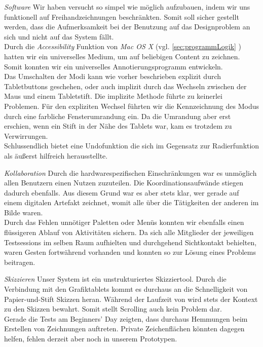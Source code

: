 \medskip \emph{Software} Wir haben versucht \scribbler so simpel wie möglich aufzubauen, indem wir uns funktionell auf Freihandzeichnungen beschränkten. Somit soll sicher gestellt werden, dass die Aufmerksamkeit bei der Benutzung auf das Designproblem an sich und nicht auf das System fällt. \\
Durch die \emph{Accessibility} Funktion von \emph{Mac OS X} (vgl. \ref{sec:programmLogik} ) hatten wir ein universelles Medium, um auf beliebigen Content zu zeichnen. Somit konnten wir ein universelles Annotierungsprogramm entwickeln. \\ 
Das Umschalten der Modi kann wie vorher beschrieben explizit durch Tabletbuttons geschehen, oder auch implizit durch das Wechseln zwischen der Maus und einem Tabletstift. Die implizite Methode führte zu keinerlei Problemen. Für den expliziten Wechsel führten wir die Kennzeichnung des Modus durch eine farbliche Fensterumrandung ein. Da die Umrandung aber erst erschien, wenn ein Stift in der Nähe des Tablets war, kam es trotzdem zu Verwirrungen. \\
Schlussendlich bietet \scribbler eine Undofunktion die sich im Gegensatz zur Radierfunktion als äußerst hilfreich herausstellte.

\medskip \emph{Kollaboration} Durch die hardwarespezifischen Einschränkungen war es unmöglich allen Benutzern einen Nutzen zuzuteilen. Die Koordinationsaufwände stiegen dadurch ebenfalls. Aus diesem Grund war es aber stets klar, wer gerade auf einem digitalen Artefakt zeichnet, womit alle über die Tätigkeiten der anderen im Bilde waren.\\
Durch das Fehlen unnötiger Paletten oder Menüs konnten wir ebenfalls einen flüssigeren Ablauf von Aktivitäten sichern. Da sich alle Mitglieder der jeweiligen Testsessions im selben Raum aufhielten und durchgehend Sichtkontakt behielten, waren Gesten fortwährend vorhanden und konnten so zur Lösung eines Problems beitragen.

\medskip \emph{Skizzieren} Unser System ist ein unstrukturiertes Skizziertool. Durch die Verbindung mit den Grafiktablets kommt es durchaus an die Schnelligkeit von Papier-und-Stift Skizzen heran. Während der Laufzeit von \scribbler wird stets der Kontext zu den Skizzen bewahrt. Somit stellt Scrolling auch kein Problem dar. \\
Gerade die Tests am Beginners' Day zeigten, dass durchaus Hemmungen beim Erstellen von Zeichnungen auftreten. Private Zeichenflächen könnten dagegen helfen, fehlen derzeit aber noch in unserem Prototypen.

